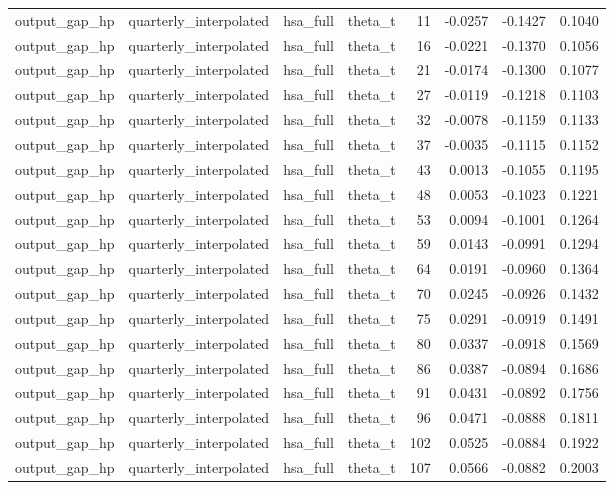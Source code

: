 \begin{tabular}{llllrrrr}
output\_gap\_hp & quarterly\_interpolated & hsa\_full & theta\_t & 11 & -0.0257 & -0.1427 & 0.1040 \\
output\_gap\_hp & quarterly\_interpolated & hsa\_full & theta\_t & 16 & -0.0221 & -0.1370 & 0.1056 \\
output\_gap\_hp & quarterly\_interpolated & hsa\_full & theta\_t & 21 & -0.0174 & -0.1300 & 0.1077 \\
output\_gap\_hp & quarterly\_interpolated & hsa\_full & theta\_t & 27 & -0.0119 & -0.1218 & 0.1103 \\
output\_gap\_hp & quarterly\_interpolated & hsa\_full & theta\_t & 32 & -0.0078 & -0.1159 & 0.1133 \\
output\_gap\_hp & quarterly\_interpolated & hsa\_full & theta\_t & 37 & -0.0035 & -0.1115 & 0.1152 \\
output\_gap\_hp & quarterly\_interpolated & hsa\_full & theta\_t & 43 & 0.0013 & -0.1055 & 0.1195 \\
output\_gap\_hp & quarterly\_interpolated & hsa\_full & theta\_t & 48 & 0.0053 & -0.1023 & 0.1221 \\
output\_gap\_hp & quarterly\_interpolated & hsa\_full & theta\_t & 53 & 0.0094 & -0.1001 & 0.1264 \\
output\_gap\_hp & quarterly\_interpolated & hsa\_full & theta\_t & 59 & 0.0143 & -0.0991 & 0.1294 \\
output\_gap\_hp & quarterly\_interpolated & hsa\_full & theta\_t & 64 & 0.0191 & -0.0960 & 0.1364 \\
output\_gap\_hp & quarterly\_interpolated & hsa\_full & theta\_t & 70 & 0.0245 & -0.0926 & 0.1432 \\
output\_gap\_hp & quarterly\_interpolated & hsa\_full & theta\_t & 75 & 0.0291 & -0.0919 & 0.1491 \\
output\_gap\_hp & quarterly\_interpolated & hsa\_full & theta\_t & 80 & 0.0337 & -0.0918 & 0.1569 \\
output\_gap\_hp & quarterly\_interpolated & hsa\_full & theta\_t & 86 & 0.0387 & -0.0894 & 0.1686 \\
output\_gap\_hp & quarterly\_interpolated & hsa\_full & theta\_t & 91 & 0.0431 & -0.0892 & 0.1756 \\
output\_gap\_hp & quarterly\_interpolated & hsa\_full & theta\_t & 96 & 0.0471 & -0.0888 & 0.1811 \\
output\_gap\_hp & quarterly\_interpolated & hsa\_full & theta\_t & 102 & 0.0525 & -0.0884 & 0.1922 \\
output\_gap\_hp & quarterly\_interpolated & hsa\_full & theta\_t & 107 & 0.0566 & -0.0882 & 0.2003 \\

\end{tabular}
